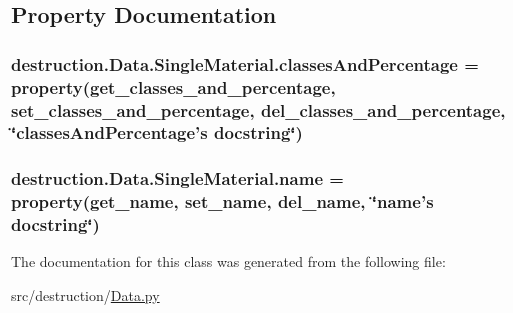 \subsection{Property Documentation}
\hypertarget{classdestruction_1_1_data_1_1_single_material_a7d820fb89b607f15edc6ba9fee703abf}{
\subsubsection[{classes\-And\-Percentage}]{\setlength{\rightskip}{0pt plus 5cm}destruction.\-Data.\-Single\-Material.\-classes\-And\-Percentage = property({\bf get\-\_\-classes\-\_\-and\-\_\-percentage}, {\bf set\-\_\-classes\-\_\-and\-\_\-percentage}, {\bf del\-\_\-classes\-\_\-and\-\_\-percentage}, \char`\"{}classes\-And\-Percentage's docstring\char`\"{})\hspace{0.3cm}{\ttfamily [static]}}}\label{classdestruction_1_1_data_1_1_single_material_a7d820fb89b607f15edc6ba9fee703abf}
\hypertarget{classdestruction_1_1_data_1_1_single_material_a298f63549f90f665484b1aa99aaeacb8}{
\subsubsection[{name}]{\setlength{\rightskip}{0pt plus 5cm}destruction.\-Data.\-Single\-Material.\-name = property({\bf get\-\_\-name}, {\bf set\-\_\-name}, {\bf del\-\_\-name}, \char`\"{}name's docstring\char`\"{})\hspace{0.3cm}{\ttfamily [static]}}}\label{classdestruction_1_1_data_1_1_single_material_a298f63549f90f665484b1aa99aaeacb8}


The documentation for this class was generated from the following file\-:\begin{DoxyCompactItemize}
\item 
src/destruction/\hyperlink{_data_8py}{Data.\-py}\end{DoxyCompactItemize}
